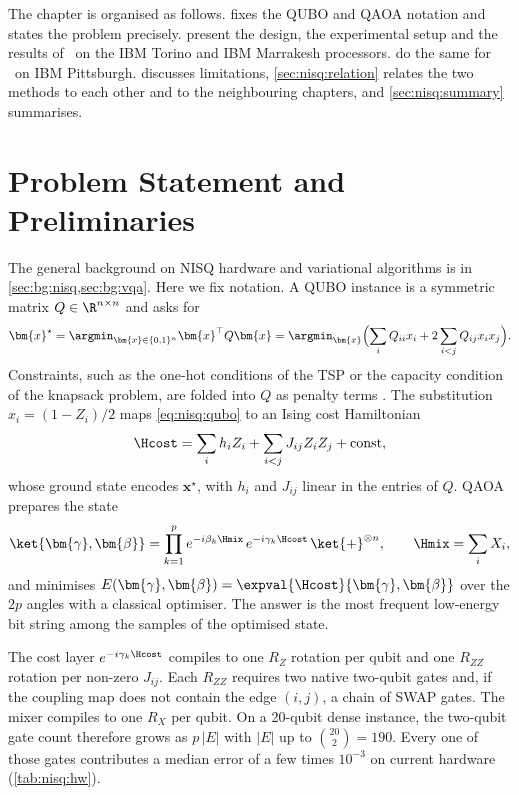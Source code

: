 The chapter is organised as follows.  fixes the QUBO and QAOA notation and states the problem precisely.  present the design, the experimental setup and the results of \deal\ on the IBM Torino and IBM Marrakesh processors.  do the same for \qawa\ on IBM Pittsburgh.  discusses limitations, \cref{sec:nisq:relation} relates the two methods to each other and to the neighbouring chapters, and \cref{sec:nisq:summary} summarises.

\section{Problem Statement and Preliminaries}\label{sec:nisq:problem}

The general background on NISQ hardware and variational algorithms is in \cref{sec:bg:nisq,sec:bg:vqa}. Here we fix notation. A QUBO instance is a symmetric matrix $Q\in\R^{n\times n}$ and asks for
\begin{equation}\label{eq:nisq:qubo}
  \bm{x}^{\star} = \argmin_{\bm{x}\in\{0,1\}^{n}} \bm{x}^{\top} Q \bm{x}
  = \argmin_{\bm{x}} \Bigl(\sum_{i} Q_{ii}x_{i} + 2\sum_{i<j} Q_{ij}x_{i}x_{j}\Bigr).
\end{equation}
Constraints, such as the one-hot conditions of the TSP or the capacity condition of the knapsack problem, are folded into $Q$ as penalty terms \cite{glover2018qubo,montanezbarrera2024unbalanced}. The substitution $x_{i}=(1-Z_{i})/2$ maps \cref{eq:nisq:qubo} to an Ising cost Hamiltonian
\begin{equation}\label{eq:nisq:ising}
  \Hcost = \sum_{i} h_{i} Z_{i} + \sum_{i<j} J_{ij} Z_{i}Z_{j} + \text{const},
\end{equation}
whose ground state encodes $\bm{x}^{\star}$, with $h_{i}$ and $J_{ij}$ linear in the entries of $Q$. QAOA prepares the state
\begin{equation}\label{eq:nisq:qaoa}
  \ket{\bm{\gamma},\bm{\beta}} = \prod_{k=1}^{p} e^{-i\beta_{k}\Hmix}\, e^{-i\gamma_{k}\Hcost}\, \ket{+}^{\otimes n},
  \qquad \Hmix = \sum_{i} X_{i},
\end{equation}
and minimises $E(\bm{\gamma},\bm{\beta})=\expval{\Hcost}{\bm{\gamma},\bm{\beta}}$ over the $2p$ angles with a classical optimiser. The answer is the most frequent low-energy bit string among the samples of the optimised state.

The cost layer $e^{-i\gamma_{k}\Hcost}$ compiles to one $R_{Z}$ rotation per qubit and one $R_{ZZ}$ rotation per non-zero $J_{ij}$. Each $R_{ZZ}$ requires two native two-qubit gates and, if the coupling map does not contain the edge $(i,j)$, a chain of SWAP gates. The mixer compiles to one $R_{X}$ per qubit. On a 20-qubit dense instance, the two-qubit gate count therefore grows as $p\,|E|$ with $|E|$ up to $\binom{20}{2}=190$. Every one of those gates contributes a median error of a few times $10^{-3}$ on current hardware (\cref{tab:nisq:hw}).


